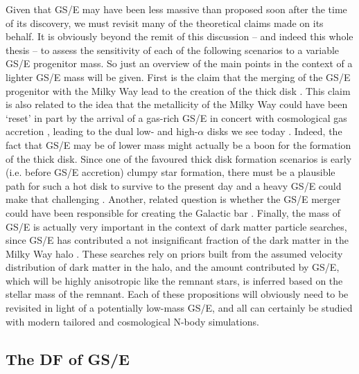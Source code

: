 Given that GS/E may have been less massive than proposed soon after the time of its discovery, we must revisit many of the theoretical claims made on its behalf. It is obviously beyond the remit of this discussion -- and indeed this whole thesis -- to assess the sensitivity of each of the following scenarios to a variable GS/E progenitor mass. So just an overview of the main points in the context of a lighter GS/E mass will be given. First is the claim that the merging of the GS/E progenitor with the Milky Way lead to the creation of the thick disk \parencite[e.g.][]{helmi18,gallart19}. This claim is also related to the idea that the metallicity of the Milky Way could have been `reset' in part by the arrival of a gas-rich GS/E in concert with cosmological gas accretion \parencite[e.g.][]{grand20,renaud21,ciuca24}, leading to the dual low- and high-$\alpha$ disks we see today \parencite[see also the two-infall model of e.g.][]{chiappini97}. Indeed, the fact that GS/E may be of lower mass might actually be a boon for the formation of the thick disk. Since one of the favoured thick disk formation scenarios is early (i.e. before GS/E accretion) clumpy star formation, there must be a plausible path for such a hot disk to survive to the present day and a heavy GS/E could make that challenging \parencite[see e.g. arguments for this in][]{deason24}. Another, related question is whether the GS/E merger could have been responsible for creating the Galactic bar \parencite{merrow23}. Finally, the mass of GS/E is actually very important in the context of dark matter particle searches, since GS/E has contributed a not insignificant fraction of the dark matter in the Milky Way halo \parencite{necib19,evans19}. These searches rely on priors built from the assumed velocity distribution of dark matter in the halo, and the amount contributed by GS/E, which will be highly anisotropic like the remnant stars, is inferred based on the stellar mass of the remnant. Each of these propositions will obviously need to be revisited in light of a potentially low-mass GS/E, and all can certainly be studied with modern tailored and cosmological N-body simulations. 

\subsection{The DF of GS/E}

